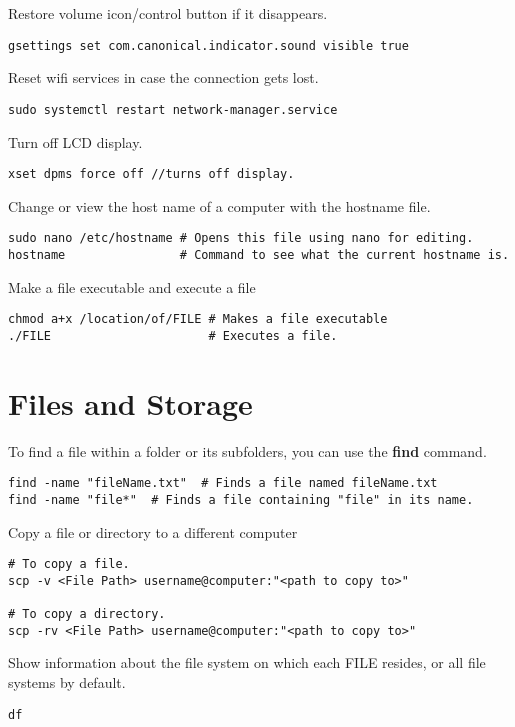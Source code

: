 Restore volume icon/control button if it disappears.
\begin{lstlisting}
gsettings set com.canonical.indicator.sound visible true
\end{lstlisting}

Reset wifi services in case the connection gets lost.
\begin{lstlisting}
sudo systemctl restart network-manager.service
\end{lstlisting}

Turn off LCD display.
\begin{lstlisting}
xset dpms force off //turns off display.
\end{lstlisting}

Change or view the host name of a computer with the hostname file.
\begin{lstlisting}
sudo nano /etc/hostname # Opens this file using nano for editing.
hostname                # Command to see what the current hostname is.
\end{lstlisting}

Make a file executable and execute a file
\begin{lstlisting}
chmod a+x /location/of/FILE # Makes a file executable
./FILE                      # Executes a file.
\end{lstlisting}



\section{Files and Storage}

To find a file within a folder or its subfolders, you can use the \textbf{find} command.
\begin{lstlisting}
find -name "fileName.txt"  # Finds a file named fileName.txt
find -name "file*"  # Finds a file containing "file" in its name.
\end{lstlisting}

Copy a file or directory to a different computer
\begin{lstlisting}
# To copy a file.
scp -v <File Path> username@computer:"<path to copy to>"

# To copy a directory.
scp -rv <File Path> username@computer:"<path to copy to>"
\end{lstlisting}

Show information about the file system on which each FILE resides, or all file systems by default.
\begin{lstlisting}
df 
\end{lstlisting}

